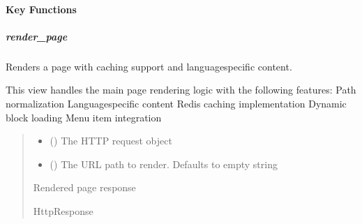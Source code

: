 \documentclass[letterpaper,10pt,english]{sphinxmanual}
\begin{document}
\paragraph{Key Functions}
\label{\detokenize{views/home:key-functions}}\label{\detokenize{views/home:module-pages_app.views.home}}

\subparagraph{render\_page}
\label{\detokenize{views/home:render-page}}

\begin{fulllineitems}
\label{\detokenize{views/home:pages_app.views.home.render_page}}
\pysigstartsignatures
\pysiglinewithargsret
{}
{\sphinxparamcomma {}}
{}
\pysigstopsignatures
\sphinxAtStartPar
Renders a page with caching support and language\sphinxhyphen{}specific content.

\sphinxAtStartPar
This view handles the main page rendering logic with the following features:
\sphinxhyphen{} Path normalization
\sphinxhyphen{} Language\sphinxhyphen{}specific content
\sphinxhyphen{} Redis caching implementation
\sphinxhyphen{} Dynamic block loading
\sphinxhyphen{} Menu item integration
\begin{quote}\begin{description}
\begin{itemize}
\item {} 
\sphinxAtStartPar
{} () \textendash{} The HTTP request object

\item {} 
\sphinxAtStartPar
{} (\sphinxstyleliteralemphasis{\sphinxupquote{, }}) \textendash{} The URL path to render. Defaults to empty string

\end{itemize}

\sphinxAtStartPar
Rendered page response

\sphinxAtStartPar
HttpResponse


\end{description}
\end{quote}
\end{fulllineitems}
\end{document}
